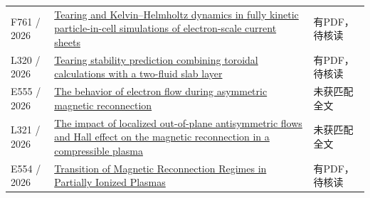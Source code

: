 \documentclass[UTF8,a4paper,11pt,openany,fontset=fandol]{ctexbook}
\begin{document}
\begin{longtable}{P{24mm}P{97mm}P{27mm}}
F761 / 2026 & \href{https://doi.org/10.1063/5.0336253}{Tearing and Kelvin–Helmholtz dynamics in fully kinetic particle-in-cell simulations of electron-scale current sheets} & 有PDF，待核读\\

L320 / 2026 & \href{https://doi.org/10.1088/1361-6587/ae7156}{Tearing stability prediction combining toroidal calculations with a two-fluid slab layer} & 有PDF，待核读\\

E555 / 2026 & \href{https://doi.org/10.1088/1402-4896/ae52bc}{The behavior of electron flow during asymmetric magnetic reconnection} & 未获匹配全文\\

L321 / 2026 & \href{https://doi.org/10.1140/epjd/s10053-025-01116-5}{The impact of localized out-of-plane antisymmetric flows and Hall effect on the magnetic reconnection in a compressible plasma} & 未获匹配全文\\

E554 / 2026 & \href{https://doi.org/10.3847/1538-4357/ae91d4}{Transition of Magnetic Reconnection Regimes in Partially Ionized Plasmas} & 有PDF，待核读\\

\bottomrule\end{longtable}\normalsize
\backmatter
\end{document}

